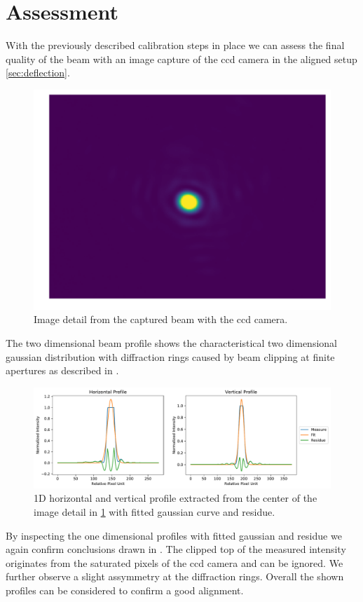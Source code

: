\section{Assessment}

With the previously described calibration steps in place we can assess the
final quality of the beam with an image capture of the \gls{ccd} camera in the
aligned setup \cref{sec:deflection}.

\begin{figure}[ht]
  \centering
  \includegraphics[width=.5\textwidth]{images/camera/profile2d.pdf}
  \caption{Image detail from the captured beam with the \gls{ccd} camera.}
  \label{fig:beamprofile:2d}
\end{figure}

The two dimensional beam profile shows the characteristical two dimensional
gaussian distribution with diffraction rings caused by beam clipping at
finite apertures as described in \cite{Hertlein2017}.

\begin{figure}[ht]
  \centering
  \includegraphics[width=\textwidth]{images/camera/profile1d.pdf}
  \caption{1D horizontal and vertical profile extracted from the center of
    the image detail in \cref{fig:beamprofile:2d} with fitted gaussian curve
  and residue.}
  \label{fig:beamprofile:1d}
\end{figure}

By inspecting the one dimensional profiles with fitted gaussian and residue
we again confirm conclusions drawn in \cite{Hertlein2017}. The clipped top
of the measured intensity originates from the saturated pixels of the
\gls{ccd} camera and can be ignored. We further observe a slight assymmetry
at the diffraction rings. Overall the shown profiles can be considered to
confirm a good alignment.
